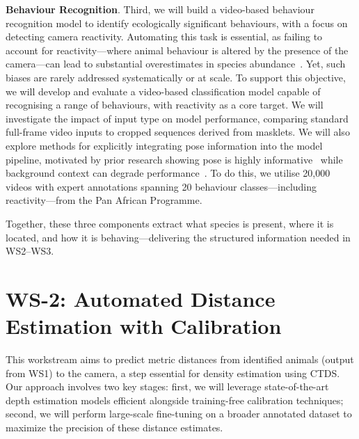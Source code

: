 \textbf{Behaviour Recognition}. Third, we will build a video-based behaviour recognition model to identify ecologically significant behaviours, with a focus on detecting camera reactivity. Automating this task is essential, as failing to account for reactivity—where animal behaviour is altered by the presence of the camera—can lead to substantial overestimates in species abundance~\cite{}. Yet, such biases are rarely addressed systematically or at scale. To support this objective, we will develop and evaluate a video-based classification model capable of recognising a range of behaviours, with reactivity as a core target. We will investigate the impact of input type on model performance, comparing standard full-frame video inputs to cropped sequences derived from masklets. We will also explore methods for explicitly integrating pose information into the model pipeline, motivated by prior research showing pose is highly informative~\cite{} while background context can degrade performance~\cite{}. To do this, we utilise 20,000 videos with expert annotations spanning 20 behaviour classes—including reactivity—from the Pan African Programme.

Together, these three components extract what species is present, where it is located, and how it is behaving—delivering the structured information needed in WS2–WS3.

\section*{WS-2: Automated Distance Estimation with Calibration}

This workstream aims to predict metric distances from identified animals (output from WS1) to the camera, a step essential for density estimation using CTDS. Our approach involves two key stages: first, we will leverage state-of-the-art depth estimation models efficient alongside training-free calibration techniques; second, we will perform large-scale fine-tuning on a broader annotated dataset to maximize the precision of these distance estimates.

